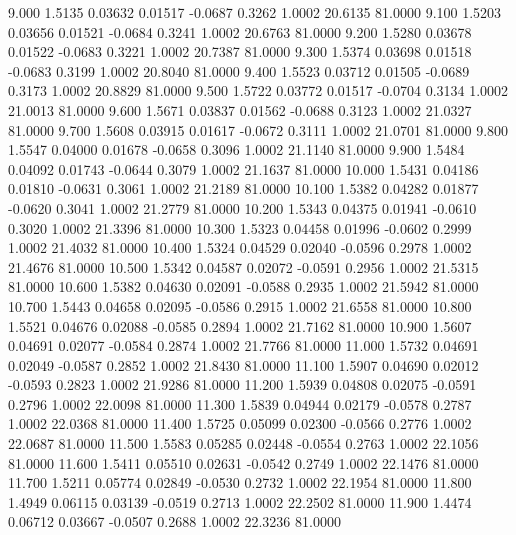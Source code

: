    9.000   1.5135   0.03632   0.01517  -0.0687   0.3262   1.0002  20.6135  81.0000
   9.100   1.5203   0.03656   0.01521  -0.0684   0.3241   1.0002  20.6763  81.0000
   9.200   1.5280   0.03678   0.01522  -0.0683   0.3221   1.0002  20.7387  81.0000
   9.300   1.5374   0.03698   0.01518  -0.0683   0.3199   1.0002  20.8040  81.0000
   9.400   1.5523   0.03712   0.01505  -0.0689   0.3173   1.0002  20.8829  81.0000
   9.500   1.5722   0.03772   0.01517  -0.0704   0.3134   1.0002  21.0013  81.0000
   9.600   1.5671   0.03837   0.01562  -0.0688   0.3123   1.0002  21.0327  81.0000
   9.700   1.5608   0.03915   0.01617  -0.0672   0.3111   1.0002  21.0701  81.0000
   9.800   1.5547   0.04000   0.01678  -0.0658   0.3096   1.0002  21.1140  81.0000
   9.900   1.5484   0.04092   0.01743  -0.0644   0.3079   1.0002  21.1637  81.0000
  10.000   1.5431   0.04186   0.01810  -0.0631   0.3061   1.0002  21.2189  81.0000
  10.100   1.5382   0.04282   0.01877  -0.0620   0.3041   1.0002  21.2779  81.0000
  10.200   1.5343   0.04375   0.01941  -0.0610   0.3020   1.0002  21.3396  81.0000
  10.300   1.5323   0.04458   0.01996  -0.0602   0.2999   1.0002  21.4032  81.0000
  10.400   1.5324   0.04529   0.02040  -0.0596   0.2978   1.0002  21.4676  81.0000
  10.500   1.5342   0.04587   0.02072  -0.0591   0.2956   1.0002  21.5315  81.0000
  10.600   1.5382   0.04630   0.02091  -0.0588   0.2935   1.0002  21.5942  81.0000
  10.700   1.5443   0.04658   0.02095  -0.0586   0.2915   1.0002  21.6558  81.0000
  10.800   1.5521   0.04676   0.02088  -0.0585   0.2894   1.0002  21.7162  81.0000
  10.900   1.5607   0.04691   0.02077  -0.0584   0.2874   1.0002  21.7766  81.0000
  11.000   1.5732   0.04691   0.02049  -0.0587   0.2852   1.0002  21.8430  81.0000
  11.100   1.5907   0.04690   0.02012  -0.0593   0.2823   1.0002  21.9286  81.0000
  11.200   1.5939   0.04808   0.02075  -0.0591   0.2796   1.0002  22.0098  81.0000
  11.300   1.5839   0.04944   0.02179  -0.0578   0.2787   1.0002  22.0368  81.0000
  11.400   1.5725   0.05099   0.02300  -0.0566   0.2776   1.0002  22.0687  81.0000
  11.500   1.5583   0.05285   0.02448  -0.0554   0.2763   1.0002  22.1056  81.0000
  11.600   1.5411   0.05510   0.02631  -0.0542   0.2749   1.0002  22.1476  81.0000
  11.700   1.5211   0.05774   0.02849  -0.0530   0.2732   1.0002  22.1954  81.0000
  11.800   1.4949   0.06115   0.03139  -0.0519   0.2713   1.0002  22.2502  81.0000
  11.900   1.4474   0.06712   0.03667  -0.0507   0.2688   1.0002  22.3236  81.0000
